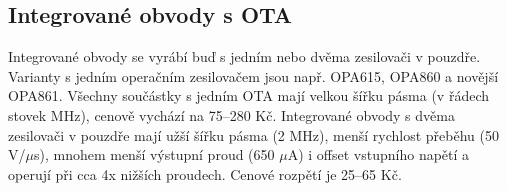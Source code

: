 \subsection{Integrované obvody s OTA}
Integrované obvody se vyrábí buď s jedním nebo dvěma zesilovači v pouzdře. Varianty s jedním operačním zesilovačem jsou např. OPA615, OPA860 a novější OPA861. Všechny součástky s jedním OTA mají velkou šířku pásma (v řádech stovek MHz), cenově vychází na 75--280 Kč. Integrované obvody s dvěma zesilovači v pouzdře mají užší šířku pásma (2 MHz), menší rychlost přeběhu (50 V/$\mu$s), mnohem menší výstupní proud (650 $\mu$A) i offset vstupního napětí a operují při cca 4x nižších proudech. Cenové rozpětí je 25--65 Kč.
\renewcommand{\arraystretch}{1.5}
\begin{table}[h]
  \caption[Porovnání integrovaných obvodů s jedním OTA]{\label{tab:Porovnání integrovaných obvodů s jedním OTA}Porovnání integrovaných obvodů s jedním OTA \cite{9}}
  \end{table}
